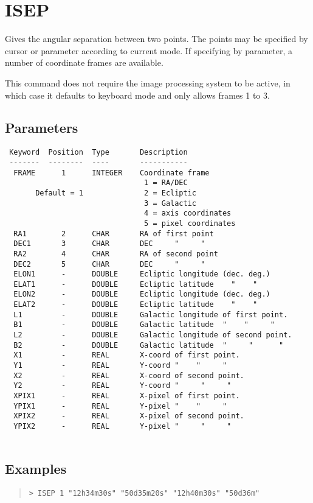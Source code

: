 \documentclass{book}
\renewcommand{\_}{{\tt\char'137}}     %
\begin{document}
\section{ISEP}
Gives the angular separation between two points. The points
may be specified by cursor or parameter according to current
mode. If specifying by parameter, a number of coordinate
frames are available.
 
This command does not require the image processing system to
be active, in which case it defaults to keyboard mode and only
allows frames 1 to 3.
 
\subsection{Parameters}
\begin{verbatim}
 Keyword  Position  Type       Description
 -------  --------  ----       -----------
  FRAME      1      INTEGER    Coordinate frame
                                1 = RA/DEC
       Default = 1              2 = Ecliptic
                                3 = Galactic
                                4 = axis coordinates
                                5 = pixel coordinates
  RA1        2      CHAR       RA of first point
  DEC1       3      CHAR       DEC     "     "
  RA2        4      CHAR       RA of second point
  DEC2       5      CHAR       DEC     "     "
  ELON1      -      DOUBLE     Ecliptic longitude (dec. deg.)
  ELAT1      -      DOUBLE     Ecliptic latitude    "    "
  ELON2      -      DOUBLE     Ecliptic longitude (dec. deg.)
  ELAT2      -      DOUBLE     Ecliptic latitude    "    "
  L1         -      DOUBLE     Galactic longitude of first point.
  B1         -      DOUBLE     Galactic latitude  "    "     "
  L2         -      DOUBLE     Galactic longitude of second point.
  B2         -      DOUBLE     Galactic latitude  "     "      "
  X1         -      REAL       X-coord of first point.
  Y1         -      REAL       Y-coord "    "     "
  X2         -      REAL       X-coord of second point.
  Y2         -      REAL       Y-coord "     "     "
  XPIX1      -      REAL       X-pixel of first point.
  YPIX1      -      REAL       Y-pixel "    "     "
  XPIX2      -      REAL       X-pixel of second point.
  YPIX2      -      REAL       Y-pixel "     "     "
 
\end{verbatim}\subsection{Examples}
\begin{quote}\begin{verbatim}
> ISEP 1 "12h34m30s" "50d35m20s" "12h40m30s" "50d36m"
\end{verbatim}\end{quote}
\end{document}
